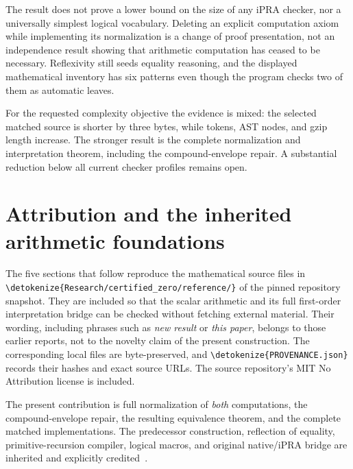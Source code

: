\documentclass[11pt,letterpaper]{article}
\theoremstyle{definition}
\theoremstyle{remark}
\newcommand{\file}[1]{\expandafter\nolinkurl\expandafter{\detokenize{#1}}}
\begin{document}
The result does not prove a lower bound on the size of any
iPRA checker, nor a universally simplest logical vocabulary.
Deleting an explicit computation axiom while implementing its
normalization is a change of proof presentation, not an
independence result showing that arithmetic computation has
ceased to be necessary. Reflexivity still seeds equality
reasoning, and the displayed mathematical inventory has six
patterns even though the program checks two of them as
automatic leaves.

For the requested complexity objective the evidence is mixed:
the selected matched source is shorter by three bytes, while
tokens, AST nodes, and gzip length increase. The stronger
result is the complete normalization and interpretation theorem,
including the compound-envelope repair. A substantial reduction
below all current checker profiles remains open.


\appendix
\clearpage
\section*{Attribution and the inherited arithmetic foundations}
The five sections that follow reproduce the mathematical source files in
\file{Research/certified_zero/reference/} of the pinned repository snapshot.
They are included so that the scalar arithmetic and its full first-order
interpretation bridge can be checked without fetching external material.
Their wording, including phrases such as \emph{new result} or \emph{this paper},
belongs to those earlier reports, not to the novelty claim of the present
construction. The corresponding local files are byte-preserved, and
\file{PROVENANCE.json} records their hashes and exact source URLs.
The source repository's MIT No Attribution license is included.

The present contribution is full normalization of \emph{both} computations,
the compound-envelope repair, the resulting equivalence theorem, and the
complete matched implementations. The predecessor construction, reflection
of equality, primitive-recursion compiler, logical macros, and original
native/iPRA bridge are inherited and explicitly credited~\cite{basis,bridge,erasure,forward,progress}.

\end{document}
